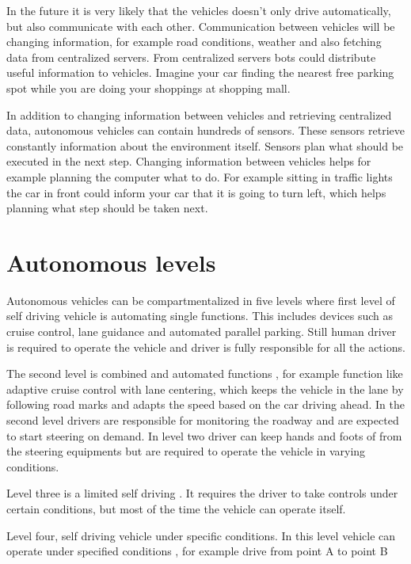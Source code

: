 \documentclass[english]{tktltiki}
\begin{document}
In the future it is very likely that the vehicles doesn't only drive 
automatically, but also communicate with each other. \cite{trafficmodels} 
Communication between vehicles will be changing information, for example road 
conditions, weather and also fetching data from centralized servers. From 
centralized servers bots could distribute useful information to vehicles. 
Imagine your car finding the nearest free parking spot while you are doing your 
shoppings at shopping mall. 

In addition to changing information between vehicles and retrieving centralized 
data, \cite{trafficmodels} autonomous vehicles can contain hundreds of sensors. These sensors 
retrieve constantly information about the environment itself. Sensors plan what 
should be executed in the next step. Changing information between vehicles helps 
for example planning the computer what to do. For example sitting in traffic 
lights the car in front could inform your car that it is going to turn left, 
which helps planning what step should be  taken next. 

\section{Autonomous levels}

Autonomous vehicles can be compartmentalized in five levels \cite{transportpolicy} where first level of self 
driving vehicle is automating single functions. This includes devices such as 
cruise control, lane guidance and automated parallel parking. 
 Still human driver is required to operate the vehicle and 
driver is fully responsible for all the actions.

The second level is combined and automated functions \cite{transportpolicy}, for example function like 
adaptive cruise control with lane centering, which keeps the vehicle in the lane 
by following road marks and adapts the speed based on the car driving ahead. In 
the second level drivers are responsible for monitoring the roadway and are 
expected to start steering on demand. In level two driver can keep hands and 
foots of from the steering equipments but are required to operate the vehicle in 
varying conditions.

Level three is a limited self driving \cite{transportpolicy}. It requires the driver to take controls 
under certain conditions, but most of the time the vehicle can operate itself. 


Level four, self driving vehicle under specific conditions. In this level 
vehicle can operate under specified conditions \cite{transportpolicy}, for example drive from point A 
to point B
\end{document}
